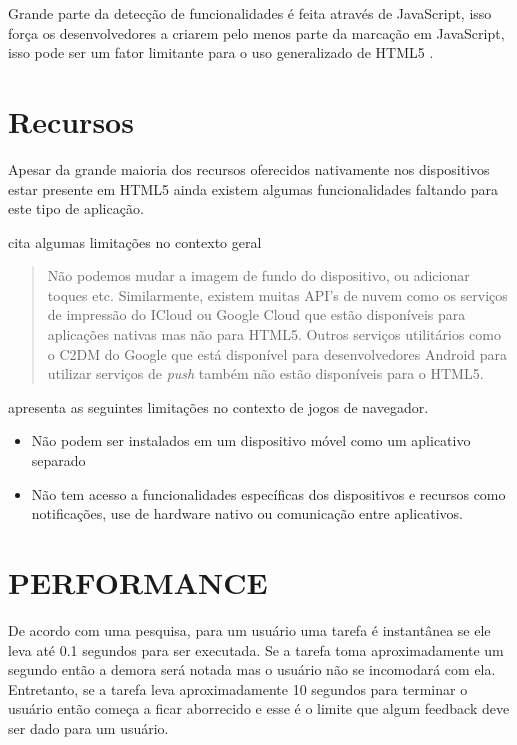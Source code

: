 \begin{draft}
Grande parte da detecção de funcionalidades é feita através de
JavaScript, isso força os desenvolvedores a criarem pelo menos parte da
marcação em JavaScript, isso pode ser um fator limitante para o uso
generalizado de HTML5 \autocite{diveIntohtml}.

\section{Recursos}

Apesar da grande maioria dos recursos oferecidos nativamente
nos dispositivos estar presente em HTML5 ainda existem algumas
funcionalidades faltando para este tipo de aplicação.

\cite{html5Tradeoffs} cita algumas limitações no contexto geral
\begin{quote}
Não podemos mudar a imagem de fundo do dispositivo, ou adicionar toques
etc. Similarmente, existem muitas API's de nuvem como os serviços
de impressão do ICloud ou Google Cloud que estão disponíveis para
aplicações nativas mas não para HTML5. Outros serviços utilitários
como o C2DM do Google que está disponível para desenvolvedores Android
para utilizar serviços de \textit{push} também não estão disponíveis
para o HTML5.
\end{quote}

\cite{browserGamesTechnologyAndFuture} apresenta as seguintes limitações
no contexto de jogos de navegador.

\begin{itemize}
\item Não podem ser instalados em um dispositivo móvel como um aplicativo separado
\item Não tem acesso a funcionalidades específicas dos dispositivos e recursos como notificações, use de hardware nativo ou comunicação entre aplicativos.
\end{itemize}

\section{PERFORMANCE}

De acordo com uma pesquisa, para um usuário uma tarefa é instantânea
se ele leva até 0.1 segundos para ser executada. Se a tarefa toma
aproximadamente um segundo então a demora será notada mas o
usuário não se incomodará com ela. Entretanto, se a tarefa leva
aproximadamente 10 segundos para terminar o usuário então começa a
ficar aborrecido e esse é o limite que algum feedback deve ser dado
para um usuário.


\end{draft}
